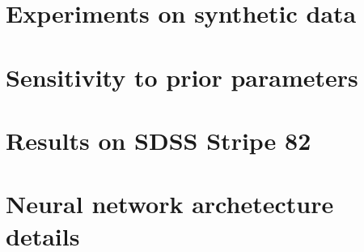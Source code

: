 \documentclass[twoside,11pt]{article}
\begin{document}
\section{Experiments on synthetic data}




\section{Sensitivity to prior parameters}
\label{sec:prior_sensitivity}



\section{Results on SDSS Stripe 82}
\label{sec:results_sparse_field}


\section{Neural network archetecture details}
\label{sec:supp_nn_archetecture}



\clearpage

\vskip 0.2in

\end{document}
